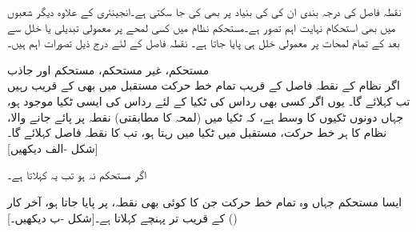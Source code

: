 نقطہ فاصل کی درجہ بندی ان کی  کی بنیاد پر بھی کی جا سکتی ہے۔انجینئری کے علاوہ دیگر شعبوں میں بھی  استحکام نہایت اہم تصور ہے۔مستحکم نظام میں کسی لمحے پر معمولی تبدیلی یا خلل سے بعد کے تمام لمحات پر معمولی خلل ہی پایا جاتا ہے۔ نقطہ فاصل کے لئے درج ذیل تصورات اہم ہیں۔

\quad مستحکم، غیر مستحکم، مستحکم اور جاذب\\
اگر نظام  کے نقطہ فاصل  کے قریب تمام خط حرکت مستقبل میں بھی  کے قریب رہیں تب    کہلائے گا۔ یوں اگر کسی بھی رداس  کی ٹکیا  کے لئے  رداس  کی ایسی ٹکیا  موجود ہو،  جہاں دونوں ٹکیوں کا وسط  ہے، کہ  ٹکیا  میں (لمحہ  کا مطابقتی) نقطہ  پر  پائے جانے والا، نظام  کا ہر خط حرکت، مستقبل میں ٹکیا  میں رہتا ہو، تب  کا نقطہ فاصل  کہلائے گا۔[شکل -الف دیکھیں]

اگر  مستحکم نہ ہو تب یہ  کہلاتا ہے۔ 

ایسا مستحکم  جہاں وہ تمام خط حرکت جن کا کوئی بھی نقطہ،  پر پایا جاتا ہو، آخر کار ()  کے قریب تر پہنچے   کہلاتا ہے۔[شکل -ب دیکھیں۔]

